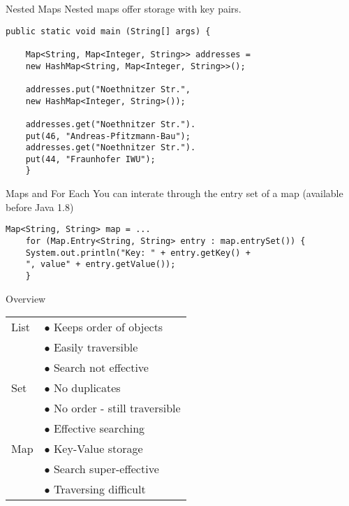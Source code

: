 \begin{frame}[fragile]{Nested Maps}
	Nested maps offer storage with key pairs.
	\begin{lstlisting}[basicstyle=\ttfamily\scriptsize]
	public static void main (String[] args) {		
	
	Map<String, Map<Integer, String>> addresses = 
	new HashMap<String, Map<Integer, String>>();
	
	addresses.put("Noethnitzer Str.", 
	new HashMap<Integer, String>());
	
	addresses.get("Noethnitzer Str.").
	put(46, "Andreas-Pfitzmann-Bau");
	addresses.get("Noethnitzer Str.").
	put(44, "Fraunhofer IWU");
	}
	\end{lstlisting}
\end{frame}

\begin{frame}[fragile]{Maps and For Each}
	You can interate through the entry set of a map (available before Java 1.8)
	\begin{lstlisting}[basicstyle=\ttfamily\scriptsize]
	Map<String, String> map = ...
	for (Map.Entry<String, String> entry : map.entrySet()) {
	System.out.println("Key: " + entry.getKey() +
	", value" + entry.getValue());
	}
	\end{lstlisting}
\end{frame}

\begin{frame}{Overview}
	\begin{center}
		\begin{tabular}{ l | l }
			List & $ \bullet $ Keeps order of objects \\
			& $ \bullet $ Easily traversible \\
			& $ \bullet $ Search not effective \\
			\hline
			Set  & $ \bullet $ No duplicates \\
			& $ \bullet $ No order - still traversible \\
			& $ \bullet $ Effective searching \\
			\hline
			Map  & $ \bullet $ Key-Value storage \\
			& $ \bullet $ Search super-effective \\
			& $ \bullet $ Traversing difficult
			
		\end{tabular}
	\end{center}
\end{frame}

